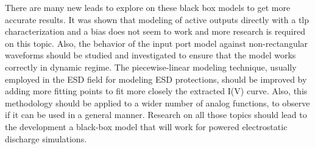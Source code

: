 There are many new leads to explore on these black box models to get more accurate results.
It was shown that modeling of active outputs directly with a \gls{tlp} characterization and a bias does not seem to work and more research is required on this topic.
Also, the behavior of the input port model against non-rectangular waveforms should be studied and investigated to ensure that the model works correctly in dynamic regime.
The piecewise-linear modeling technique, usually employed in the ESD field for modeling ESD protections, should be improved by adding more fitting points to fit more closely the extracted I(V) curve.
Also, this methodology should be applied to a wider number of analog functions, to observe if it can be used in a general manner.
Research on all those topics should lead to the development a black-box model that will work for powered electrostatic discharge simulations.
